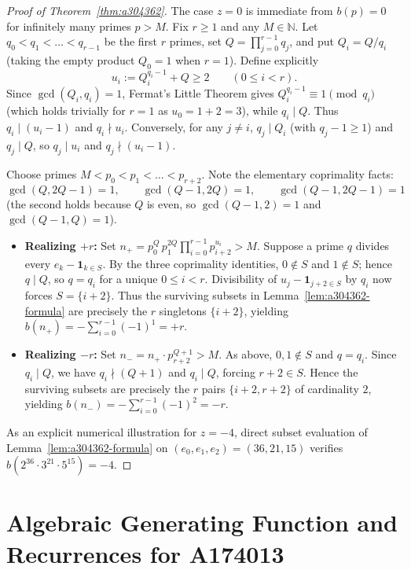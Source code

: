 \documentclass[11pt,a4paper]{article}
\theoremstyle{definition}
\theoremstyle{remark}
\newcommand{\N}{\mathbb{N}}
\begin{document}
\begin{proof}[Proof of Theorem~\ref{thm:a304362}]
The case $z = 0$ is immediate from $b(p) = 0$ for infinitely many primes $p > M$. Fix $r \ge 1$ and any $M \in \N$. Let $q_0 < q_1 < \dots < q_{r-1}$ be the first $r$ primes, set $Q = \prod_{j=0}^{r-1} q_j$, and put $Q_i = Q / q_i$ (taking the empty product $Q_0 = 1$ when $r = 1$). Define explicitly
\[
  u_i := Q_i^{q_i - 1} + Q \ge 2 \qquad (0 \le i < r).
\]
Since $\gcd(Q_i, q_i) = 1$, Fermat's Little Theorem gives $Q_i^{q_i - 1} \equiv 1 \pmod{q_i}$ (which holds trivially for $r=1$ as $u_0 = 1 + 2 = 3$), while $q_i \mid Q$. Thus $q_i \mid (u_i - 1)$ and $q_i \nmid u_i$. Conversely, for any $j \ne i$, $q_j \mid Q_i$ (with $q_j - 1 \ge 1$) and $q_j \mid Q$, so $q_j \mid u_i$ and $q_j \nmid (u_i - 1)$.

Choose primes $M < p_0 < p_1 < \dots < p_{r+2}$. Note the elementary coprimality facts:
\[
  \gcd(Q, 2Q - 1) = 1, \qquad \gcd(Q - 1, 2Q) = 1, \qquad \gcd(Q - 1, 2Q - 1) = 1
\]
(the second holds because $Q$ is even, so $\gcd(Q-1, 2) = 1$ and $\gcd(Q-1, Q) = 1$).
\begin{itemize}
  \item \textbf{Realizing $+r$:} Set $n_+ = p_0^Q \, p_1^{2Q} \prod_{i=0}^{r-1} p_{i+2}^{u_i} > M$. Suppose a prime $q$ divides every $e_k - \mathbf{1}_{k \in S}$. By the three coprimality identities, $0 \notin S$ and $1 \notin S$; hence $q \mid Q$, so $q = q_i$ for a unique $0 \le i < r$. Divisibility of $u_j - \mathbf{1}_{j+2 \in S}$ by $q_i$ now forces $S = \{i + 2\}$. Thus the surviving subsets in Lemma~\ref{lem:a304362-formula} are precisely the $r$ singletons $\{i+2\}$, yielding $b(n_+) = -\sum_{i=0}^{r-1} (-1)^1 = +r$.
  \item \textbf{Realizing $-r$:} Set $n_- = n_+ \cdot p_{r+2}^{Q+1} > M$. As above, $0, 1 \notin S$ and $q = q_i$. Since $q_i \mid Q$, we have $q_i \nmid (Q+1)$ and $q_i \mid Q$, forcing $r+2 \in S$. Hence the surviving subsets are precisely the $r$ pairs $\{i+2, r+2\}$ of cardinality $2$, yielding $b(n_-) = -\sum_{i=0}^{r-1} (-1)^2 = -r$.
\end{itemize}
As an explicit numerical illustration for $z = -4$, direct subset evaluation of Lemma~\ref{lem:a304362-formula} on $(e_0,e_1,e_2) = (36,21,15)$ verifies $b(2^{36}\cdot 3^{21}\cdot 5^{15}) = -4$.
\end{proof}

\section{Algebraic Generating Function and Recurrences for A174013}
\end{document}
